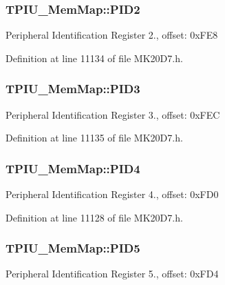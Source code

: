 \subsubsection[{\texorpdfstring{P\+I\+D2}{PID2}}]{ T\+P\+I\+U\+\_\+\+Mem\+Map\+::\+P\+I\+D2}\hypertarget{struct_t_p_i_u___mem_map_a9c86b62f691869178b490b1641d83afe}{}\label{struct_t_p_i_u___mem_map_a9c86b62f691869178b490b1641d83afe}
Peripheral Identification Register 2., offset\+: 0x\+F\+E8 

Definition at line 11134 of file M\+K20\+D7.\+h.

\subsubsection[{\texorpdfstring{P\+I\+D3}{PID3}}]{ T\+P\+I\+U\+\_\+\+Mem\+Map\+::\+P\+I\+D3}\hypertarget{struct_t_p_i_u___mem_map_abf0fc2738afe793c35be489ddee5c0e0}{}\label{struct_t_p_i_u___mem_map_abf0fc2738afe793c35be489ddee5c0e0}
Peripheral Identification Register 3., offset\+: 0x\+F\+EC 

Definition at line 11135 of file M\+K20\+D7.\+h.

\subsubsection[{\texorpdfstring{P\+I\+D4}{PID4}}]{ T\+P\+I\+U\+\_\+\+Mem\+Map\+::\+P\+I\+D4}\hypertarget{struct_t_p_i_u___mem_map_ad70cfe6551cef4070f3f838a9a66c821}{}\label{struct_t_p_i_u___mem_map_ad70cfe6551cef4070f3f838a9a66c821}
Peripheral Identification Register 4., offset\+: 0x\+F\+D0 

Definition at line 11128 of file M\+K20\+D7.\+h.

\subsubsection[{\texorpdfstring{P\+I\+D5}{PID5}}]{ T\+P\+I\+U\+\_\+\+Mem\+Map\+::\+P\+I\+D5}\hypertarget{struct_t_p_i_u___mem_map_a538891793ff7ccfae685d49a0603dc77}{}\label{struct_t_p_i_u___mem_map_a538891793ff7ccfae685d49a0603dc77}
Peripheral Identification Register 5., offset\+: 0x\+F\+D4 

